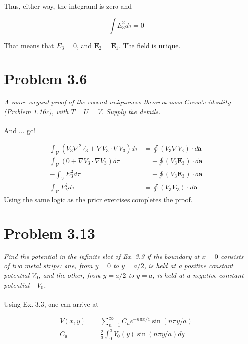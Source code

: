 \documentclass[10pt]{article}
\begin{document}
Thus, either way, the integrand is zero and 

\begin{equation}
\int E_3^2 d\tau = 0
\end{equation}

That means that $E_3 = 0$, and $\mathbf{E}_2 = \mathbf{E}_1$.  The field is unique.

\section{Problem 3.6}

\textit{A more elegant proof of the second uniqueness theorem uses Green's identity (Problem 1.16c), with $T = U = V$.  Supply the details.} \\ \\

And ... go!

\begin{align}
\int_\mathcal{V} (V_3 \nabla^2 V_3 + \nabla V_3 \cdot \nabla V_3) d\tau &= \oint (V_3 \nabla V_3) \cdot d\mathbf{a} \\
\int_\mathcal{V} (0 + \nabla V_3 \cdot \nabla V_3) d\tau &= - \oint (V_3 \mathbf{E}_3) \cdot d\mathbf{a} \\
- \int_\mathcal{V} E_3^2 d\tau &= - \oint (V_3 \mathbf{E}_3) \cdot d\mathbf{a} \\
\int_\mathcal{V} E_3^2 d\tau &= \oint (V_3 \mathbf{E}_3) \cdot d\mathbf{a}
\end{align}
Using the same logic as the prior exercises completes the proof.

\section{Problem 3.13}

\textit{Find the potential in the infinite slot of Ex. 3.3 if the boundary at $x=0$ consists of two metal strips: one, from $y=0$ to $y=a/2$, is held at a positive constant potential $V_0$, and the other, from $y=a/2$ to $y=a$, is held at a negative constant potential $-V_0$.} \\ \\

Using Ex. 3.3, one can arrive at

\begin{align}
V(x,y) &= \sum_{n = 1}^{\infty} C_n e^{-n \pi x / a} \sin(n \pi y / a) \\
C_n &= \frac{2}{a}\int_0^a V_0(y) \sin(n \pi y / a) dy 
\end{align}
\end{document}
